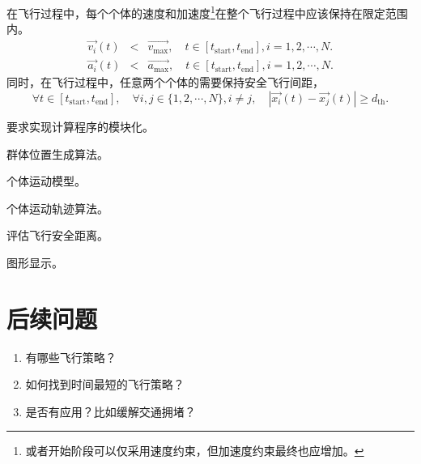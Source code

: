 在飞行过程中，每个个体的速度和加速度\footnote[1]{或者开始阶段可以仅采用速度约束，但加速度约束最终也应增加。}在整个飞行过程中应该保持在限定范围内。
\begin{eqnarray}
	\vec{v_i}(t)&<& \vec{v_{\text{max}}} , \quad t\in[t_{\text{start}},t_{\text{end}}], i=1,2,\cdots,N. \label{e:alimDef} \\
	\vec{a_i}(t)&<& \vec{a_{\text{max}}} , \quad t\in[t_{\text{start}},t_{\text{end}}], i=1,2,\cdots,N. \label{e:vlimDef}
\end{eqnarray}
同时，在飞行过程中，任意两个个体的需要保持安全飞行间距，
\begin{equation}\label{e:dlimDef}
	\forall t \in [t_{\text{start}},t_{\text{end}}], \quad \forall i,j\in \{1,2,\cdots,N\}, i\ne j, \quad |\vec{x_i}(t)-\vec{x_j}(t)| \ge d_{\text{th}}.
\end{equation}

要求实现计算程序的模块化。

群体位置生成算法。

个体运动模型。

个体运动轨迹算法。

评估飞行安全距离。

图形显示。


\section{后续问题}
\begin{enumerate}
	\item 有哪些飞行策略？
	\item 如何找到时间最短的飞行策略？
	\item 是否有应用？比如缓解交通拥堵？
\end{enumerate}





%



